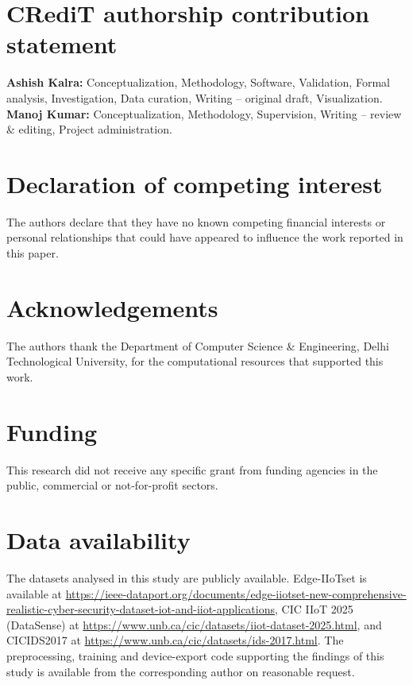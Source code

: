 \documentclass[10pt,letterpaper,twocolumn]{article}
\begin{document}

\section*{CRediT authorship contribution statement}

\textbf{Ashish Kalra:} Conceptualization, Methodology, Software, Validation,
Formal analysis, Investigation, Data curation, Writing -- original draft,
Visualization. \textbf{Manoj Kumar:} Conceptualization, Methodology,
Supervision, Writing -- review \& editing, Project administration.

\section*{Declaration of competing interest}

The authors declare that they have no known competing financial interests or
personal relationships that could have appeared to influence the work reported
in this paper.

\section*{Acknowledgements}

The authors thank the Department of Computer Science \& Engineering, Delhi
Technological University, for the computational resources that supported this
work.

\section*{Funding}

This research did not receive any specific grant from funding agencies in the
public, commercial or not-for-profit sectors.

\section*{Data availability}

The datasets analysed in this study are publicly available. Edge-IIoTset is
available at
\url{https://ieee-dataport.org/documents/edge-iiotset-new-comprehensive-realistic-cyber-security-dataset-iot-and-iiot-applications},
CIC IIoT 2025 (DataSense) at
\url{https://www.unb.ca/cic/datasets/iiot-dataset-2025.html}, and
CICIDS2017 at \url{https://www.unb.ca/cic/datasets/ids-2017.html}. The
preprocessing, training and device-export code supporting the findings of this
study is available from the corresponding author on reasonable request.
\end{document}
